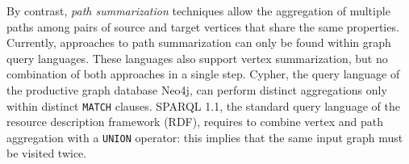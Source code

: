 By contrast, \textit{path summarization} techniques allow the aggregation of multiple paths among pairs of source and target vertices that share the same properties.
Currently, approaches to path summarization can only be found within graph query languages.
These languages also support vertex summarization, but no combination of both approaches in a single step.
Cypher, the query language of the productive graph database Neo4j, can perform distinct aggregations only within distinct \texttt{MATCH} clauses. SPARQL 1.1, the standard query language of the resource description framework (RDF), requires to combine vertex and path aggregation with a \texttt{UNION} operator: this implies that the same input graph must be visited twice.

